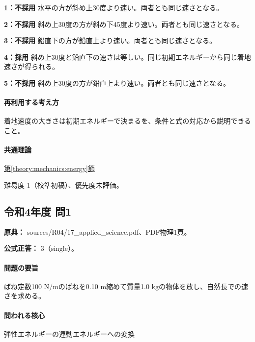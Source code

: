 \noindent\textbf{1：不採用} 水平の方が斜め上30度より速い。両者とも同じ速さとなる。\par

\noindent\textbf{2：不採用} 斜め上30度の方が斜め下45度より速い。両者とも同じ速さとなる。\par

\noindent\textbf{3：不採用} 鉛直下の方が鉛直上より速い。両者とも同じ速さとなる。\par

\noindent\textbf{4：採用} 斜め上30度と鉛直下の速さは等しい。同じ初期エネルギーから同じ着地速さが得られる。\par

\noindent\textbf{5：不採用} 斜め上30度の方が鉛直上より速い。両者とも同じ速さとなる。\par

\paragraph{再利用する考え方} 着地速度の大きさは初期エネルギーで決まるを、条件と式の対応から説明できること。

\paragraph{共通理論} \hyperref[theory:mechanics:energy]{第\ref*{theory:mechanics:energy}節}

\par 難易度 1（校準初稿）、優先度未評価。

\subsection{令和4年度 問1}
\label{q:r04-reg-applied-01}

\noindent\textbf{原典：} sources/R04/17\_applied\_science.pdf、PDF物理1頁。

\textbf{公式正答：} 3（single）。

\paragraph{問題の要旨} ばね定数100 N/mのばねを0.10 m縮めて質量1.0 kgの物体を放し、自然長での速さを求める。

\paragraph{問われる核心} 弾性エネルギーの運動エネルギーへの変換

